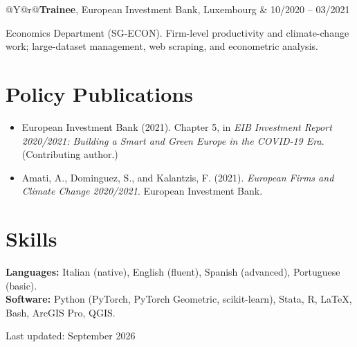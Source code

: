 \documentclass[11pt,a4paper]{article}
\makeatletter
\newcommand{\entry}[2]{\noindent\begin{tabularx}{\textwidth}{@{}Y@{\hspace{1em}}r@{}}#1 & #2\end{tabularx}\par}
\makeatother
\begin{document}
\entry{\textbf{Trainee}, European Investment Bank, Luxembourg}{10/2020 -- 03/2021}
Economics Department (SG-ECON). Firm-level productivity and climate-change work; large-dataset management, web scraping, and econometric analysis.

\section{Policy Publications}
\begin{itemize}
\item European Investment Bank (2021). Chapter 5, in \emph{EIB Investment Report 2020/2021: Building a Smart and Green Europe in the COVID-19 Era}. (Contributing author.)
\item Amati, A., Dominguez, S., and Kalantzis, F. (2021). \emph{European Firms and Climate Change 2020/2021}. European Investment Bank.
\end{itemize}

\section{Skills}
\textbf{Languages:} Italian (native), English (fluent), Spanish (advanced), Portuguese (basic).\\
\textbf{Software:} Python (PyTorch, PyTorch Geometric, scikit-learn), Stata, R, \LaTeX, Bash, ArcGIS Pro, QGIS.

\vfill
{\footnotesize\color{rule}Last updated: September 2026}
\end{document}
